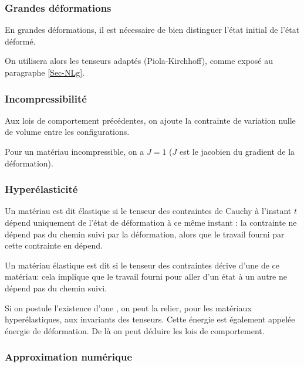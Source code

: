 \medskip
\subsubsection{Grandes déformations}
En grandes déformations, il est nécessaire de bien distinguer l'état initial de
l'état déformé.

On utilisera alors les tenseurs adaptés (Piola-Kirchhoff), comme exposé au paragraphe \ref{Sec-NLg}.


\medskip
\subsubsection{Incompressibilité}

Aux lois de comportement précédentes, on ajoute la contrainte de variation
nulle de volume entre les configurations.

Pour un matériau incompressible, on  a $J=1$ ($J$ est le jacobien du gradient de la déformation).




\medskip
\subsubsection{Hyperélasticité}

Un matériau est dit élastique si le tenseur des contraintes de Cauchy à l'instant $t$
dépend uniquement de l'état de déformation à ce même instant : la contrainte ne
dépend pas du chemin suivi par la déformation, alors que le travail fourni par cette
contrainte en dépend.

Un matériau élastique est dit  si le tenseur des contraintes dérive
d'une  de ce matériau: cela implique que le travail fourni pour aller 
d'un état à un autre ne dépend pas du chemin suivi.

Si on postule l'existence d'une , on peut la relier, pour les matériaux
hyperélastiques, aux invariants des tenseurs. Cette énergie est également appelée énergie de 
déformation. De là on peut déduire les lois de comportement.




\medskip
\subsubsection{Approximation numérique}


